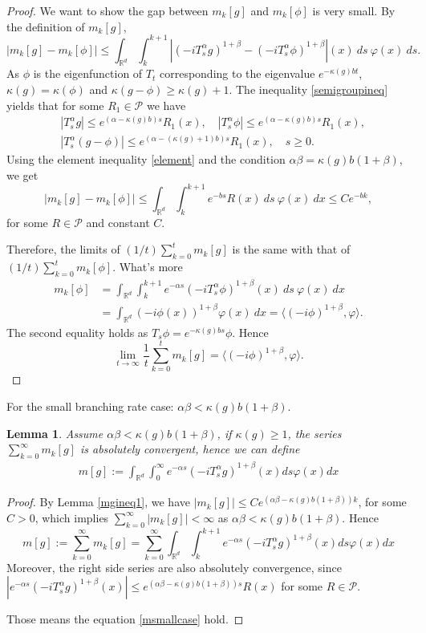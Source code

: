 \documentclass{article}
\newtheorem{lemma}{Lemma}[section]
\begin{document}
\begin{proof}
    We want to show the gap between $m_k[g]$ and $m_k[\phi]$ is very small. By the definition of $m_k[g]$, 
    $$|m_k[g]-m_k[\phi]|\leq\int_{\mathbb{R}^d}\int_k^{k+1}\left|(-i T^{\alpha}_s g)^{1+\beta}-(-i T^{\alpha}_s \phi)^{1+\beta}\right|(x)~ds~\varphi(x)~ds.$$
    As $\phi$ is the eigenfunction of $T_t$ corresponding to the eigenvalue $e^{-\kappa(g)bt}$,  $\kappa(g)=\kappa(\phi)$ and $\kappa(g-\phi)\geq \kappa(g)+1$. The inequality \eqref{semigroupineq} yields that for some $R_1\in\mathcal{P}$ we have
    \begin{align*}
        &|T_s^{\alpha}g|\leq e^{(\alpha-\kappa(g)b)s}R_1(x), \quad|T_s^{\alpha}\phi|\leq e^{(\alpha-\kappa(g)b)s}R_1(x), \\ 
        &|T_s^{\alpha}(g-\phi)|\leq e^{(\alpha-(\kappa(g)+1)b)s}R_1(x), \quad s\geq0.
    \end{align*}
  Using the element inequality \eqref{element} and the condition $\alpha\beta=\kappa(g)b(1+\beta)$, we get
    $$|m_k[g]-m_k[\phi]|\leq\int_{\mathbb{R}^d}\int_k^{k+1}e^{-bs}R(x)~ds~\varphi(x)~dx\leq C e^{-bk},$$
    for some $R\in\mathcal{P}$ and constant $C$.
    
    Therefore, the limits of $(1/t)\sum_{k=0}^tm_k[g]$ is the same with that of $(1/t)\sum_{k=0}^tm_k[\phi]$. What's more
    \begin{align*}
        m_k[\phi]&=\int_{\mathbb{R}^d}\int_k^{k+1} e^{-\alpha s}(-iT_{s}^{\alpha}\phi)^{1+\beta}(x)~ds~\varphi(x)~dx\\
        &=\int_{\mathbb{R}^d}(-i\phi(x))^{1+\beta}\varphi (x)~dx=\langle (-i\phi)^{1+\beta},\varphi\rangle.
    \end{align*}
    The second equality holds as $T_s\phi=e^{-\kappa(g)bs}\phi$. Hence
    $$\lim_{t\rightarrow \infty}\frac{1}{t}\sum_{k=0}^{t}m_k[g]=\langle(-i\phi)^{1+\beta},\varphi\rangle.$$
\end{proof}

For the small branching rate case: $\alpha\beta<\kappa(g)b(1+\beta)$.
\begin{lemma}\label{lemma211}
Assume $\alpha\beta<\kappa(g)b(1+\beta)$, if $\kappa(g)\geq 1$, the series $\sum_{k=0}^{\infty}m_k[g]$ is absolutely convergent, hence we can define
\begin{align}
    m[g]:=\int_{\mathbb{R}^d}\int_0^{\infty} e^{-\alpha s}(-iT_{s}^{\alpha}g)^{1+\beta}(x)ds\varphi(x)dx \label{msmallcase}
\end{align}
\end{lemma}
\begin{proof}
    By Lemma \ref{mgineq1}, we have $|m_k[g]|\leq C e^{(\alpha\beta-\kappa(g)b(1+\beta))k}$, for some $C>0$, which implies $\sum_{k=0}^{\infty}|m_k[g]|<\infty$ as $\alpha\beta<\kappa(g)b(1+\beta)$. Hence
    $$m[g]:=\sum_{k=0}^{\infty}m_k[g]=\sum_{k=0}^{\infty}\int_{\mathbb{R}^d}\int_k^{k+1} e^{-\alpha s}(-iT_{s}^{\alpha}g)^{1+\beta}(x)ds\varphi(x)dx$$
     Moreover, the right side series are also absolutely convergence, since $|e^{-\alpha s}(-iT_{s}^{\alpha}g)^{1+\beta}(x)|\leq e^{(\alpha\beta-\kappa(g)b(1+\beta))s}R(x)$ for some $R \in \mathcal{P}$. 
     
     Those means the equation \eqref{msmallcase} hold.
\end{proof}
\end{document}
